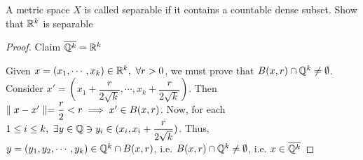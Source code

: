 A metric space $X$ is called separable if it contains a countable dense subset. Show that $\mathbb{R}^k$ is separable

\begin{proof}
	Claim $\overline{\mathbb{Q}^k} = \mathbb{R}^k$
	
	Given $x = (x_1,\cdots,x_k) \in \mathbb{R}^k,~ \forall r > 0$, we must prove that $B(x,r) \cap \mathbb{Q}^k \neq \emptyset$. Consider $x' = (x_1 + \dfrac{r}{2\sqrt{k}},\cdots,x_k+\dfrac{r}{2\sqrt{k}})$. Then $\parallel x - x' \parallel = \dfrac{r}{2} < r \implies x' \in B(x,r)$. Now, for each $1 \leq i \leq k,~ \exists y \in \mathbb{Q} \ni y_i \in (x_i,x_i + \dfrac{r}{2\sqrt{k}})$. Thus, $y = (y_1,y_2,\cdots,y_k) \in \mathbb{Q}^k \cap B(x,r)$, i.e. $B(x,r) \cap \mathbb{Q}^k \neq \emptyset$, i.e. $x \in \overline{\mathbb{Q}^k}$
\end{proof}